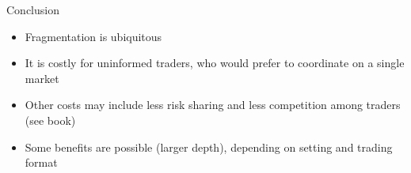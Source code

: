 \documentclass[english,10pt
,aspectratio=169
]{beamer}
\begin{document}
%
%
%
%
%
%
%


\begin{frame}{Conclusion}
	\begin{itemize}
		\item Fragmentation is ubiquitous 
		\item It is costly for uninformed traders, who would prefer to coordinate on a single market
		\item Other costs may include less risk sharing and less competition among traders (see book)
		\item Some benefits are possible (larger depth), depending on setting and trading format
	\end{itemize}
\end{frame}
\end{document}
